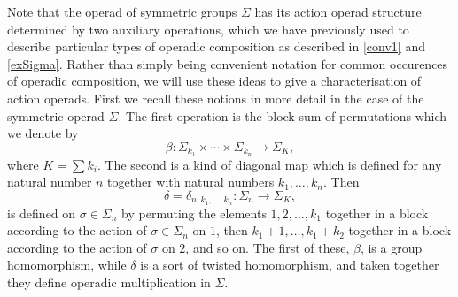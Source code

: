 Note that the operad of symmetric groups $\Sigma$ has its action operad structure determined by two auxiliary operations, which we have previously used to describe particular types of operadic composition as described in \cref{conv1} and \cref{exSigma}. Rather than simply being convenient notation for common occurences of operadic composition, we will use these ideas to give a characterisation of action operads. First we recall these notions in more detail in the case of the symmetric operad $\Sigma$. The first operation is the block sum of permutations which we denote by
  \[
    \beta \colon \Sigma_{k_{1}} \times \cdots \times \Sigma_{k_{n}} \rightarrow \Sigma_{K},
  \]
where $K = \sum k_{i}$. The second is a kind of diagonal map which is defined for any natural number $n$ together with natural numbers $k_{1}, \ldots, k_{n}$. Then
  \[
    \delta = \delta_{n; k_{1}, \ldots, k_{n}} \colon \Sigma_{n} \rightarrow \Sigma_{K},
  \]
is defined on $\sigma \in \Sigma_{n}$ by permuting the elements $1, 2, \ldots, k_{1}$ together in a block according to the action of $\sigma \in \Sigma_{n}$ on $1$, then $k_{1}+1, \ldots, k_{1}+k_{2}$ together in a block according to the action of $\sigma$ on $2$, and so on. The first of these, $\beta$, is a group homomorphism, while $\delta$ is a sort of twisted homomorphism, and taken together they define operadic multiplication in $\Sigma$.




